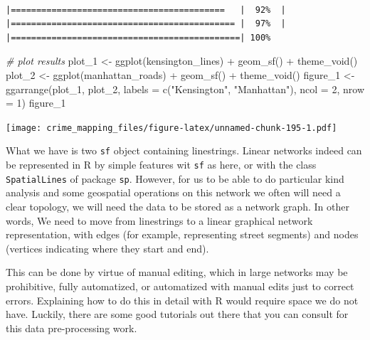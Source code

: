 \documentclass[
  krantz2]{krantz}
\makeatletter
\newenvironment{Shaded}{\begin{snugshade}}{\end{snugshade}}
\newcommand{\AttributeTok}[1]{\textcolor[rgb]{0.61,0.61,0.61}{#1}}
\newcommand{\CommentTok}[1]{\textcolor[rgb]{0.37,0.37,0.37}{\textit{#1}}}
\newcommand{\DecValTok}[1]{\textcolor[rgb]{0.06,0.06,0.06}{#1}}
\newcommand{\FunctionTok}[1]{\textcolor[rgb]{0,0,0}{#1}}
\newcommand{\NormalTok}[1]{#1}
\newcommand{\OtherTok}[1]{\textcolor[rgb]{0.37,0.37,0.37}{#1}}
\newcommand{\SpecialCharTok}[1]{\textcolor[rgb]{0,0,0}{#1}}
\newcommand{\StringTok}[1]{\textcolor[rgb]{0.5,0.5,0.5}{#1}}
\newenvironment{kframe}{%
\medskip{}
\setlength{\fboxsep}{.8em}
 \def\at@end@of@kframe{}%
 \ifinner\ifhmode%
  \def\at@end@of@kframe{\end{minipage}}%
  \begin{minipage}{\columnwidth}%
 \fi\fi%
 \def\FrameCommand##1{\hskip\@totalleftmargin \hskip-\fboxsep
 \colorbox{shadecolor}{##1}\hskip-\fboxsep
     \hskip-\linewidth \hskip-\@totalleftmargin \hskip\columnwidth}%
 \MakeFramed {\advance\hsize-\width
   \@totalleftmargin\z@ \linewidth\hsize
   \@setminipage}}%
 {\par\unskip\endMakeFramed%
 \at@end@of@kframe}
\renewenvironment{Shaded}{\begin{kframe}}{\end{kframe}}
\makeatother
\begin{document}
\begin{verbatim}
                                            |==========================================   |  92%  |                                                     |============================================ |  97%  |                                                     |=============================================| 100%
\end{verbatim}

\begin{Shaded}
\begin{Highlighting}[]
\CommentTok{\# plot results }
\NormalTok{plot\_1 }\OtherTok{\textless{}{-}} \FunctionTok{ggplot}\NormalTok{(kensington\_lines) }\SpecialCharTok{+} \FunctionTok{geom\_sf}\NormalTok{() }\SpecialCharTok{+} \FunctionTok{theme\_void}\NormalTok{()}
\NormalTok{plot\_2 }\OtherTok{\textless{}{-}} \FunctionTok{ggplot}\NormalTok{(manhattan\_roads) }\SpecialCharTok{+} \FunctionTok{geom\_sf}\NormalTok{() }\SpecialCharTok{+} \FunctionTok{theme\_void}\NormalTok{()}
\NormalTok{figure\_1 }\OtherTok{\textless{}{-}} \FunctionTok{ggarrange}\NormalTok{(plot\_1, plot\_2, }\AttributeTok{labels =} \FunctionTok{c}\NormalTok{(}\StringTok{"Kensington"}\NormalTok{, }\StringTok{"Manhattan"}\NormalTok{),}
                    \AttributeTok{ncol =} \DecValTok{2}\NormalTok{, }\AttributeTok{nrow =} \DecValTok{1}\NormalTok{)}
\NormalTok{figure\_1}
\end{Highlighting}
\end{Shaded}

\texttt{[image: crime\_mapping\_files/figure-latex/unnamed-chunk-195-1.pdf]}

What we have is two \texttt{sf} object containing linestrings. Linear networks indeed can be represented in R by simple features wit \texttt{sf} as here, or with the class \texttt{SpatialLines} of package \texttt{sp}. However, for us to be able to do particular kind analysis and some geospatial operations on this network we often will need a clear topology, we will need the data to be stored as a network graph. In other words, We need to move from linestrings to a linear graphical network representation, with edges (for example, representing street segments) and nodes (vertices indicating where they start and end).

This can be done by virtue of manual editing, which in large networks may be prohibitive, fully automatized, or automatized with manual edits just to correct errors. Explaining how to do this in detail with R would require space we do not have. Luckily, there are some good tutorials out there that you can consult for this data pre-processing work.
\end{document}
